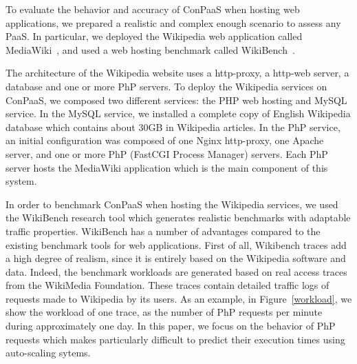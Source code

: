 To evaluate the behavior and accuracy of ConPaaS when hosting web applications, we prepared a realistic and complex enough scenario to assess any PaaS. In particular, we deployed the Wikipedia web application called MediaWiki~\cite{mediawiki}, and used a web hosting benchmark called WikiBench~\cite{wikibench}. 


The architecture of the Wikipedia website uses a http-proxy, a http-web server, a database and one or more PhP servers. To deploy the Wikipedia services on ConPaaS, we composed two different services: the PHP web hosting and MySQL service. In the MySQL service, we installed a complete copy of English Wikipedia database which contains about 30GB in Wikipedia articles. In the PhP service, an initial configuration was composed of one Nginx http-proxy, one Apache server, and one or more PhP (FastCGI Process Manager) servers. Each PhP server hosts the MediaWiki application which is the main component of this system. 



In order to benchmark ConPaaS when hosting the Wikipedia services, we used the WikiBench research tool which generates realistic benchmarks with adaptable traffic properties. WikiBench has a number of advantages compared to the existing benchmark tools for web applications. First of all, Wikibench traces add a high degree of realism, since it is entirely based on the Wikipedia software and data. Indeed, the benchmark workloads are generated based on real access traces from the WikiMedia Foundation. These traces contain detailed  traffic logs of requests made to Wikipedia by its users. As an example, in Figure~\ref{workload}, we show the workload of one trace, as the number of PhP requests per minute during approximately one day.  In this paper, we focus on the behavior of PhP requests which makes particularly difficult to predict their execution times using auto-scaling sytems. 


